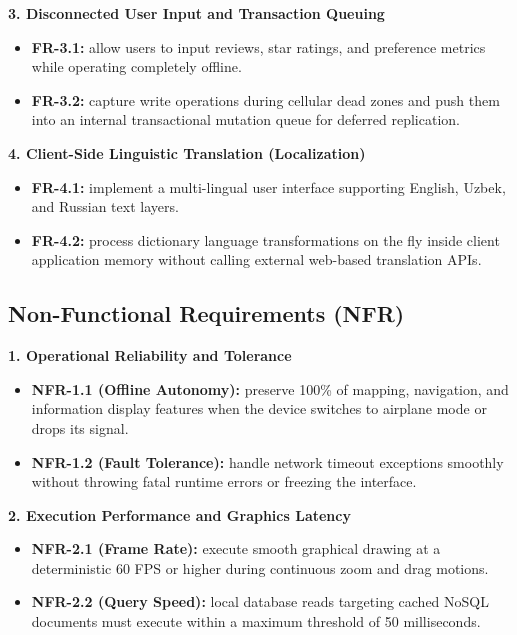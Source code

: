 \documentclass[12pt,a4paper,oneside]{report}
\begin{document}
\textbf{3. Disconnected User Input and Transaction Queuing}
\begin{itemize}[leftmargin=1.4em]
  \item \textbf{FR-3.1:} allow users to input reviews, star ratings, and preference
        metrics while operating completely offline.
  \item \textbf{FR-3.2:} capture write operations during cellular dead zones and push them
        into an internal transactional mutation queue for deferred replication.
\end{itemize}

\textbf{4. Client-Side Linguistic Translation (Localization)}
\begin{itemize}[leftmargin=1.4em]
  \item \textbf{FR-4.1:} implement a multi-lingual user interface supporting English,
        Uzbek, and Russian text layers.
  \item \textbf{FR-4.2:} process dictionary language transformations on the fly inside
        client application memory without calling external web-based translation APIs.
\end{itemize}

\subsection{Non-Functional Requirements (NFR)}

\textbf{1. Operational Reliability and Tolerance}
\begin{itemize}[leftmargin=1.4em]
  \item \textbf{NFR-1.1 (Offline Autonomy):} preserve 100\% of mapping, navigation, and
        information display features when the device switches to airplane mode or drops
        its signal.
  \item \textbf{NFR-1.2 (Fault Tolerance):} handle network timeout exceptions smoothly
        without throwing fatal runtime errors or freezing the interface.
\end{itemize}

\textbf{2. Execution Performance and Graphics Latency}
\begin{itemize}[leftmargin=1.4em]
  \item \textbf{NFR-2.1 (Frame Rate):} execute smooth graphical drawing at a deterministic
        60 FPS or higher during continuous zoom and drag motions.
  \item \textbf{NFR-2.2 (Query Speed):} local database reads targeting cached NoSQL
        documents must execute within a maximum threshold of 50 milliseconds.
\end{itemize}
\end{document}
